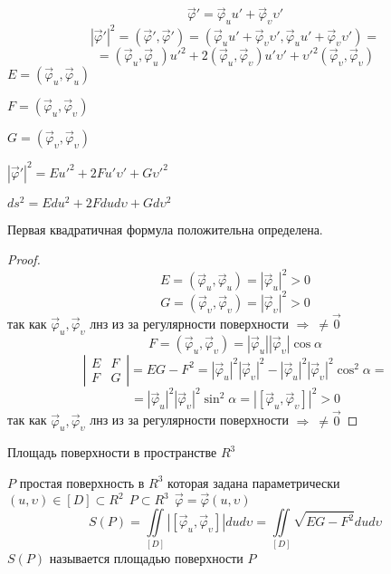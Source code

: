 \begin{define}
  $$
  \vec \varphi' = \vec \varphi_u u' + \vec \varphi_{\upsilon} \upsilon'
  $$
  $$
  |\vec \varphi'|^2 = (\vec \varphi', \vec \varphi') =
  (\vec \varphi_u u' + \vec \varphi_{\upsilon} \upsilon', \vec \varphi_u u' +
  \vec \varphi_{\upsilon} \upsilon') =
  $$
  $$
  = (\vec \varphi_u, \vec \varphi_u)u'^2 + 2(\vec \varphi_u,
  \vec \varphi_{\upsilon}) u' \upsilon' + \upsilon'^2 (\vec \varphi_{\upsilon},
  \vec \varphi_{\upsilon})
  $$
  $E = (\vec \varphi_u, \vec \varphi_u)$

  $F = (\vec \varphi_u, \vec \varphi_{\upsilon})$

  $G = (\vec \varphi_{\upsilon}, \vec \varphi_{\upsilon})$

  $|\vec \varphi'|^2 = E u'^2 + 2Fu'\upsilon' + G\upsilon'^2$

  $ds^2 = Edu^2 + 2Fdud\upsilon + Gd\upsilon^2$
\end{define}

\begin{theorem}
  Первая квадратичная формула положительна определена.
\end{theorem}

\begin{proof}
  $$
  E = (\vec \varphi_u, \vec \varphi_u) = |\vec \varphi_u|^2 > 0
  $$
  $$
  G = (\vec \varphi_{\upsilon}, \vec \varphi_{\upsilon}) =
  |\vec \varphi_{\upsilon}|^2 > 0
  $$
  так как $\vec \varphi_u, \vec \varphi_{\upsilon}$ лнз из за регулярности
  поверхности $\Rightarrow ~ \not= \vec 0$
  $$
  F = (\vec \varphi_u, \vec \varphi_{\upsilon}) = |\vec \varphi_u|
  |\vec \varphi_{\upsilon}| \cos \alpha
  $$
  $$
  \left|
  \begin{array}{cc}
    E & F \\
    F & G
  \end{array}
  \right|
  = EG - F^2 = |\vec \varphi_u|^2|\vec \varphi_{\upsilon}|^2 -
  |\vec \varphi_u|^2 |\vec \varphi_{\upsilon}|^2 \cos^2 \alpha =
  $$
  $$
  = |\vec \varphi_u|^2
  |\vec \varphi_{\upsilon}|^2 \sin^2 \alpha = |[\vec \varphi_u, \vec
  \varphi_{\upsilon}]|^2 > 0
  $$
  так как $\vec \varphi_u, \vec \varphi_{\upsilon}$ лнз из за регулярности
  поверхности $\Rightarrow ~ \not= \vec 0$
\end{proof}

\begin{title}[\Large]
  Площадь поверхности в пространстве $R^3$
\end{title}

\begin{block}
  $P$ простая поверхность в $R^3$ которая задана параметрически
  $(u, \upsilon) \in [D] \subset R^2 ~~ P \subset R^3 ~~ \vec \varphi = \vec
  \varphi(u, \upsilon)$
  $$
  S(P) = \iint \limits_{[D]} |[\vec \varphi_u, \vec \varphi_{\upsilon}]|
  du d\upsilon = \iint \limits_{[D]} \sqrt{EG - F^2}dud\upsilon
  $$
  $S(P)$ называется площадью поверхности $P$
\end{block}

